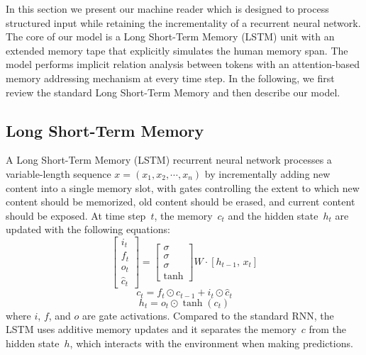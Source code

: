 \documentclass[11pt,letterpaper]{article}
\begin{document}
        In this section we present our machine reader which is
        designed to process structured input while retaining the
        incrementality of a recurrent neural network.  The core of our
        model is a Long Short-Term Memory (LSTM) unit with an extended
        memory tape that explicitly simulates the human memory
        span. The model performs implicit relation analysis between
        tokens with an attention-based memory addressing mechanism at
        every time step. In the following, we first review the
        standard Long Short-Term Memory and then describe our model.
	
	\subsection{Long Short-Term Memory}
	\label{sec:long-short-term-1}
	A Long Short-Term Memory (LSTM) recurrent neural network processes a
	variable-length sequence $x=(x_1, x_2, \cdots, x_n)$ by incrementally
	adding new content into a single memory slot, with gates controlling
	the extent to which new content should be memorized, old content
	should be erased, and current content should be exposed. At time
	step~$t$, the memory~$c_t$ and the hidden state~$h_t$ are updated with
	the following equations:
	\begin{equation}
		\begin{bmatrix}
			i_t\\ f_t\\ o_t\\ \hat{c}_t
		\end{bmatrix} =
		\begin{bmatrix} \sigma\\ \sigma\\ \sigma\\ \tanh
		\end{bmatrix} W\cdot [h_{t-1}, \, x_t]
		\label{beginlstm}
	\end{equation}
	\begin{equation} c_t = f_t \odot c_{t-1} +
		i_t \odot \hat{c}_t
	\end{equation}
	\begin{equation} h_t = o_t \odot \tanh(c_t)
		\label{endlstm}
	\end{equation} 
	where $i$, $f$, and $o$ are gate activations. Compared to the
        standard RNN, the LSTM uses additive memory updates and it separates the memory~$c$ from the
        hidden state~$h$, which interacts with the environment when
        making predictions.
          
\end{document}
